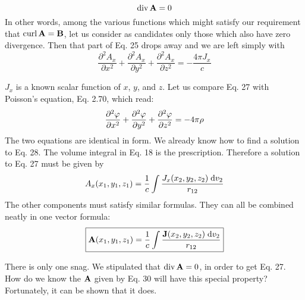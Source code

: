 \begin{equation}
  \operatorname{div} \mathbf{A} = 0
\end{equation}
In other words, among the various functions which might satisfy our
requirement that $\operatorname{curl}\mathbf{A} = \mathbf{B}$, let us consider as candidates only those
which also have zero divergence. Then that part of Eq. 25 drops
away and we are left simply with
\begin{equation}
  \frac{\partial^2 A_x}{\partial x^2}
  + \frac{\partial^2 A_x}{\partial y^2}
  + \frac{\partial^2 A_x}{\partial z^2}
 = -\frac{4\pi J_x}{c}
\end{equation}

$J_x$ is a known scalar function of $x$, $y$, and $z$. Let us compare Eq. 27 with
Poisson's equation, Eq. 2.70, which read:
\begin{equation}
  \frac{\partial^2 \varphi}{\partial x^2}
  + \frac{\partial^2 \varphi}{\partial y^2}
  + \frac{\partial^2 \varphi}{\partial z^2}
 = -4\pi \rho
\end{equation}
The two equations are identical in form. We already know how to
find a solution to Eq. 28. The volume integral in Eq. 18 is the 
prescription. Therefore a solution to Eq. 27 must be given by
\begin{equation}
  A_x(x_1,y_1,z_1) = \frac{1}{c}\int \frac{J_x(x_2,y_2,z_2)\;\textup{d} v_2}{r_{12}}
\end{equation}
The other components must satisfy similar formulas. They can all
be combined neatly in one vector formula:
\begin{equation}
\boxed{
  \mathbf{A}(x_1,y_1,z_1) = \frac{1}{c}\int \frac{\mathbf{J}(x_2,y_2,z_2)\;\textup{d} v_2}{r_{12}}
}
\end{equation}

There is only one snag. We stipulated that $\operatorname{div}\mathbf{A} = 0$, in order to
get Eq. 27. How do we know the $\mathbf{A}$ given by Eq. 30 will have this
special property? Fortunately, it can be shown that it does.

